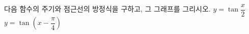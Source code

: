 다음 함수의 주기와 점근선의 방정식을 구하고, 그 그래프를 그리시오.
 $y=\tan\dfrac{x}{2}$
 $y=\tan\left(x-\dfrac{\pi}{4}\right)$
